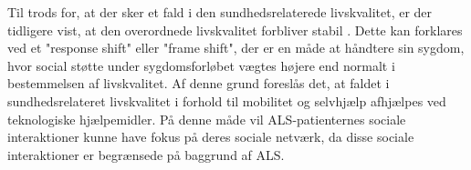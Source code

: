 
\noindent
Til trods for, at der sker et fald i den sundhedsrelaterede livskvalitet, er der tidligere vist, at den overordnede livskvalitet forbliver stabil \citep{ilse2015, nuebert2004}. Dette kan forklares ved et "response shift" eller "frame shift", der er en måde at håndtere sin sygdom, hvor social støtte under sygdomsforløbet vægtes højere end normalt i bestemmelsen af livskvalitet. \citep{ilse2015} Af denne grund foreslås det, at faldet i sundhedsrelateret livskvalitet i forhold til mobilitet og selvhjælp afhjælpes ved teknologiske hjælpemidler. På denne måde vil ALS-patienternes sociale interaktioner kunne have fokus på deres sociale netværk, da disse sociale interaktioner er begrænsede på baggrund af ALS. \citep{ilse2015,tramonti2012}







